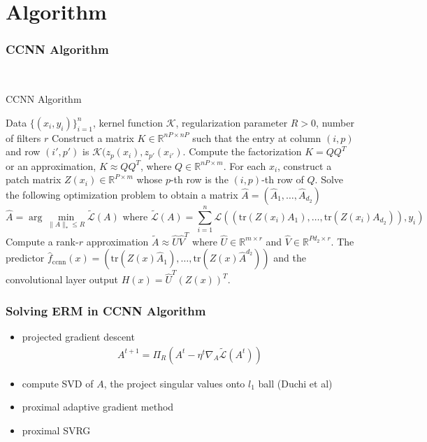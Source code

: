 \documentclass[hyperref={colorlinks}]{beamer}
\newcommand{\set}[1]{\mathbb{#1}}
\newcommand{\trace}[1]{\mathrm{tr}\left(#1\right)}
\begin{document}
\section{Algorithm}
\begin{frame}
	\frametitle{CCNN Algorithm}
	~
	\begin{algorithm}[H]
		\caption{CCNN Algorithm}
		\label{alg:ccnn-algorithm}
		\footnotesize
		\begin{algorithmic}[1]
			\REQUIRE Data $\{(x_i, y_i)\}_{i = 1}^n$, kernel function $\mathcal{K}$, regularization parameter $R > 0$, number of filters $r$
			\STATE Construct a matrix $K \in \set{R}^{nP \times nP}$ such that the entry at column $(i, p)$ and row $(i', p')$ is $\mathcal{K}(z_p(x_i), z_{p'}(x_{i'})$. Compute the factorization $K = QQ^T$ or an approximation, $K \approx QQ^T$, where $Q \in \set{R}^{nP \times m}$.
			\STATE For each $x_i$, construct a patch matrix $Z(x_i) \in \set{R}^{P \times m}$ whose $p$-th row is the $(i, p)$-th row of $Q$.
			\STATE Solve the following optimization problem to obtain a matrix $\hat{A} = (\hat{A}_1, \ldots, \hat{A}_{d_2})$
			$$\hat{A} = \arg \min_{\|A\|_* \leq R} \tilde{\mathcal{L}}(A) \text{ where } \tilde{\mathcal{L}}(A) = \sum_{i = 1}^n \mathcal{L}\left((\trace{Z(x_i) A_1}, \ldots, \trace{Z(x_i) A_{d_2}}), y_i\right)$$
			\STATE Compute a rank-$r$ approximation $\tilde{A} \approx \hat{U} \hat{V}^T$ where $\hat{U} \in \set{R}^{m \times r}$ and $\hat{V} \in \set{R}^{Pd_2 \times r}$.
			\RETURN The predictor $\hat{f}_{\text{ccnn}}(x) = \left(\trace{Z(x) \hat{A}_1}, \ldots, \trace{Z(x) \hat{A}^{d_2}}\right)$ and the convolutional layer output $H(x) = \hat{U}^T (Z(x))^T$.
		\end{algorithmic}
	\end{algorithm}
\end{frame}

\begin{frame}
	\frametitle{Solving ERM in CCNN Algorithm}
	\begin{itemize}
		\item projected gradient descent
		\begin{align*}
			A^{t+1}=\Pi_R(A^t-\eta^t\nabla_A\tilde{\mathcal{L}}(A^t))
		\end{align*}
		\item compute SVD of $A$, the project singular values onto $l_1$ ball (Duchi et al)
		\item proximal adaptive gradient method
		\item proximal SVRG
	\end{itemize}
\end{frame}
\end{document}
